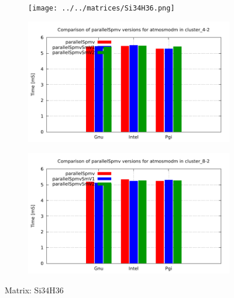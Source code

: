 \begin{figure} [ht!]
    \centering
    \captionsetup{justification=centering, singlelinecheck=false}
    \begin{subfigure}{.25\textwidth}
      \centering
      \hspace*{-1.5cm} 
      \texttt{[image: ../../matrices/Si34H36.png]}
      \label{fig:Si34H36_matrix}
    \end{subfigure}%
    \begin{subfigure}{.37\textwidth}
      \centering
      \hspace*{-1.0cm} 
      \includegraphics[page=7, width=0.95\linewidth]{../plots/myCluster_4-2.pdf}
      \label{fig:Si34H36_performance}
    \end{subfigure}
    \begin{subfigure}{.37\textwidth}
      \centering
      \hspace*{-1.0cm} 
      \includegraphics[page=7, width=0.95\linewidth]{../plots/myCluster_8-2.pdf}
      \label{fig:Si34H36_performance}
    \end{subfigure}
\caption{Matrix: Si34H36}
\label{fig:Si34H36}
\end{figure}

